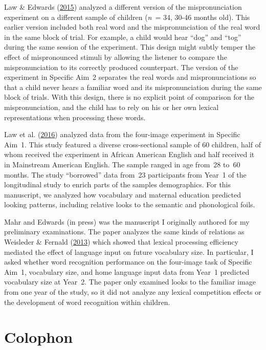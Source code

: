 \documentclass [11pt, proquest] {uwthesis}[2015/03/03]
\begin{document}
Law \& Edwards (\protect\hyperlink{ref-MPPaper}{2015}) analyzed a
different version of the mispronunciation experiment on a different
sample of children (\emph{n}~= 34, 30-46 months old). This earlier
version included both real word and the mispronunciation of the real
word in the same block of trial. For example, a child would hear ``dog''
and ``tog'' during the same session of the experiment. This design might
subtly temper the effect of mispronounced stimuli by allowing the
listener to compare the mispronunciation to its correctly produced
counterpart. The version of the experiment in Specific Aim~2 separates
the real words and mispronunciations so that a child never hears a
familiar word and its mispronunciation during the same block of trials.
With this design, there is no explicit point of comparison for the
mispronunciation, and the child has to rely on his or her own lexical
representations when processing these words.

Law et al. (\protect\hyperlink{ref-RWLPaper}{2016}) analyzed data from
the four-image experiment in Specific Aim~1. This study featured a
diverse cross-sectional sample of 60 children, half of whom received the
experiment in African American English and half received it in
Mainstream American English. The sample ranged in age from~28 to~60
months. The study ``borrowed'' data from~23 participants from Year~1 of
the longitudinal study to enrich parts of the samples demographics. For
this manuscript, we analyzed how vocabulary and maternal education
predicted looking patterns, including relative looks to the semantic and
phonological foils.

Mahr and Edwards (in press) was the manuscript I originally authored for
my preliminary examinations. The paper analyzes the same kinds of
relations as Weisleder \& Fernald
(\protect\hyperlink{ref-Weisleder2013}{2013}) which showed that lexical
processing efficiency mediated the effect of language input on future
vocabulary size. In particular, I asked whether word recognition
performance on the four-image task of Specific Aim~1, vocabulary size,
and home language input data from Year~1 predicted vocabulary size at
Year~2. The paper only examined looks to the familiar image from one
year of the study, so it did not analyze any lexical competition effects
or the development of word recognition within children.

\backmatter

\chapter*{Colophon}\label{colophon}
\end{document}
